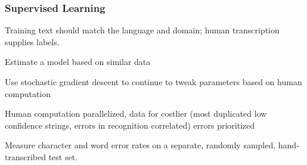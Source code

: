 \documentclass[compress, black]{beamer}
\begin{document}
\begin{frame}
\frametitle{Supervised Learning}
  \begin{large_enum}
  \item[--]<1->Training text should match the language and domain; human transcription supplies labels.
  \item[--]<2->Estimate a model based on similar data
  \item[--]<3->Use stochastic gradient descent to continue to tweak parameters based on human computation
  \item[--]<4->Human computation parallelized, data for costlier (most duplicated low confidence strings, errors in recognition correlated) errors prioritized
  \item[--]<5->Measure character and word error rates on a separate, randomly sampled, hand-transcribed test set.
  \end{large_enum}
\end{frame}
\end{document}
